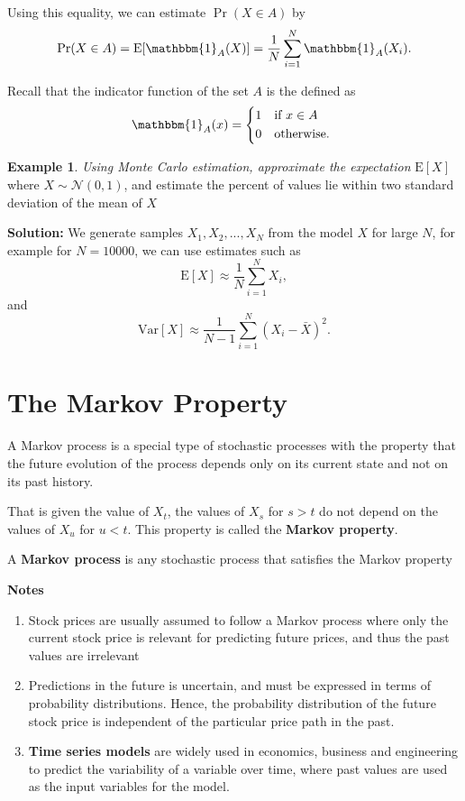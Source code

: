 \documentclass[
]{book}
\theoremstyle{definition}
\theoremstyle{definition}
\newtheorem{example}{Example}[chapter]
\theoremstyle{definition}
\theoremstyle{definition}
\theoremstyle{remark}
\begin{document}
Using this equality, we can estimate \(\Pr(X \in A)\) by
\[\Pr(X \in A) = \mathrm{E}[\mathbbm{1}_A(X)] = \frac{1}{N}\sum_{i=1}^N \mathbbm{1}_A(X_i).\]

Recall that the indicator function of the set \(A\) is the defined as
\[\mathbbm{1}_A(x) =
\begin{cases*}
     1          & if $x \in A $ \\
      0        & otherwise.
\end{cases*}\]

\begin{example}
\emph{Using Monte Carlo estimation, approximate the expectation}
\(\mathrm{E}[X]\) where \(X \sim \mathcal{N}(0,1)\), and estimate the
percent of values lie within two standard deviation of the mean of \(X\)
\end{example}

\textbf{Solution:} We generate samples \(X_1,X_2,...,X_N\) from the model \(X\)
for large \(N\), for example for \(N = 10000\), we can use estimates such as
\[\mathrm{E}[X] \approx \frac{1}{N}\sum_{i=1}^N X_i,\] and
\[\mathrm{Var}[X] \approx \frac{1}{N-1}\sum_{i=1}^N (X_i - \bar{X})^2.\]

\hypertarget{the-markov-property}{%
\section{The Markov Property}\label{the-markov-property}}

A Markov process is a special type of stochastic processes with the
property that the future evolution of the process depends only on its
current state and not on its past history.

That is given the value of \(X_t\), the values of \(X_s\) for \(s > t\) do not
depend on the values of \(X_u\) for \(u < t\). This property is called the
\textbf{Markov property}.

A \textbf{Markov process} is any stochastic process that satisfies the Markov
property

\textbf{Notes}

\begin{enumerate}
\def\labelenumi{\arabic{enumi}.}
\item
  Stock prices are usually assumed to follow a Markov process where
  only the current stock price is relevant for predicting future
  prices, and thus the past values are irrelevant
\item
  Predictions in the future is uncertain, and must be expressed in
  terms of probability distributions. Hence, the probability
  distribution of the future stock price is independent of the
  particular price path in the past.
\item
  \textbf{Time series models} are widely used in economics, business and
  engineering to predict the variability of a variable over time,
  where past values are used as the input variables for the model.
\end{enumerate}
\end{document}
